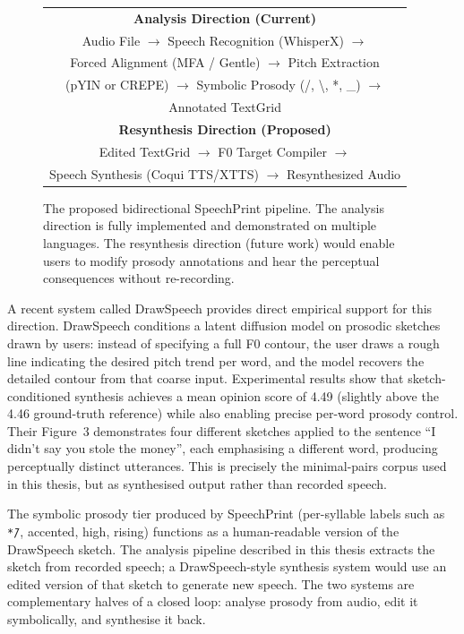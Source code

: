 \begin{figure}[htbp]
\centering
\begin{tabular}{|c|}
\hline
\textbf{Analysis Direction (Current)} \\[0.5em]
Audio File $\rightarrow$ Speech Recognition (WhisperX) $\rightarrow$ \\
Forced Alignment (MFA / Gentle) $\rightarrow$ Pitch Extraction \\
(pYIN or CREPE) $\rightarrow$ Symbolic Prosody (/, \textbackslash, *, \_) $\rightarrow$ \\
Annotated TextGrid \\[1em]
\hline
\textbf{Resynthesis Direction (Proposed)} \\[0.5em]
Edited TextGrid $\rightarrow$ F0 Target Compiler $\rightarrow$ \\
Speech Synthesis (Coqui TTS/XTTS) $\rightarrow$ Resynthesized Audio \\
\hline
\end{tabular}
\caption{The proposed bidirectional SpeechPrint pipeline. The analysis direction
is fully implemented and demonstrated on multiple languages. The resynthesis direction
(future work) would enable users to modify prosody annotations and hear the perceptual
consequences without re-recording.}
\label{fig:resynthesis_pipeline}
\end{figure}

A recent system called DrawSpeech \cite{chen2025drawspeech} provides
direct empirical support for this direction. DrawSpeech conditions a
latent diffusion model on prosodic sketches drawn by users: instead of
specifying a full F0 contour, the user draws a rough line indicating the
desired pitch trend per word, and the model recovers the detailed contour
from that coarse input. Experimental results show that sketch-conditioned
synthesis achieves a mean opinion score of 4.49 (slightly above the
4.46 ground-truth reference) while also enabling precise per-word
prosody control. Their Figure~3 demonstrates four different sketches
applied to the sentence ``I didn't say you stole the money'', each
emphasising a different word, producing perceptually distinct utterances.
This is precisely the minimal-pairs corpus used in this thesis, but as
synthesised output rather than recorded speech.

The symbolic prosody tier
produced by SpeechPrint (per-syllable labels such as
\texttt{*{\={}}/}, accented, high, rising) functions as a
human-readable version of the DrawSpeech sketch. The analysis pipeline
described in this thesis extracts the sketch from recorded speech; a
DrawSpeech-style synthesis system would use an edited version of that
sketch to generate new speech. The two systems are complementary halves
of a closed loop: analyse prosody from audio, edit it symbolically, and
synthesise it back.

